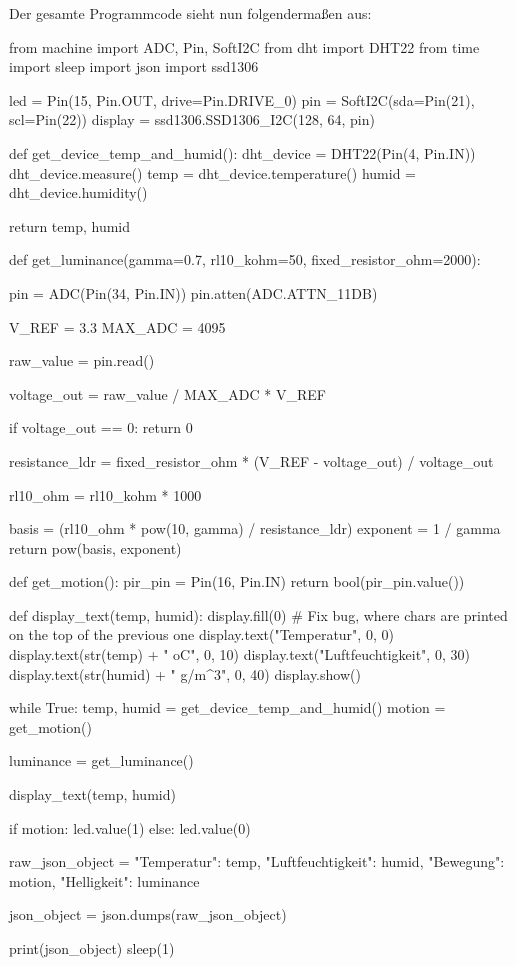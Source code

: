 \documentclass[18pt]{article}
\begin{document}
Der gesamte Programmcode sieht nun folgendermaßen aus:
\begin{python}
from machine import ADC, Pin, SoftI2C
from dht import DHT22
from time import sleep
import json
import ssd1306
	
led = Pin(15, Pin.OUT, drive=Pin.DRIVE_0)
pin = SoftI2C(sda=Pin(21), scl=Pin(22))
display = ssd1306.SSD1306_I2C(128, 64, pin)
	
def get_device_temp_and_humid():
	dht_device = DHT22(Pin(4, Pin.IN))
	dht_device.measure()
	temp = dht_device.temperature()
	humid = dht_device.humidity()
	
	return temp, humid
	
def get_luminance(gamma=0.7, 
	rl10_kohm=50, fixed_resistor_ohm=2000):

	pin = ADC(Pin(34, Pin.IN))
	pin.atten(ADC.ATTN_11DB)

	V_REF = 3.3 
	MAX_ADC = 4095

	raw_value = pin.read() 

	voltage_out = raw_value / MAX_ADC * V_REF

	if voltage_out == 0:
		return 0

	resistance_ldr = fixed_resistor_ohm * (V_REF - voltage_out) / voltage_out

	rl10_ohm = rl10_kohm * 1000 

	basis = (rl10_ohm * pow(10, gamma) / resistance_ldr)
	exponent = 1 / gamma
	return pow(basis, exponent)
	
def get_motion():
	pir_pin = Pin(16, Pin.IN)
	return bool(pir_pin.value())
	
def display_text(temp, humid):
	display.fill(0) # Fix bug, where chars are printed on the top of the previous one
	display.text("Temperatur", 0, 0)
	display.text(str(temp) + " oC", 0, 10)
	display.text("Luftfeuchtigkeit", 0, 30)
	display.text(str(humid) + " g/m^3", 0, 40)
	display.show()
	
	
while True:	
	temp, humid = get_device_temp_and_humid()
	motion = get_motion()
	
	luminance = get_luminance()
	
	display_text(temp, humid)
	
	if motion:
		led.value(1)
	else:
		led.value(0)
	
	raw_json_object = {
		"Temperatur": temp,
		"Luftfeuchtigkeit": humid,
		"Bewegung": motion,
		"Helligkeit": luminance
	}
	
	json_object = json.dumps(raw_json_object)
	
	print(json_object)
	sleep(1)
\end{python}
\end{document}
